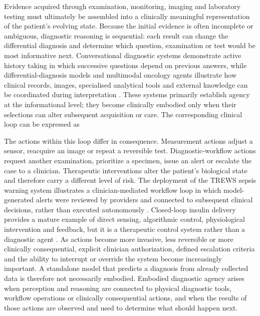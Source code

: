 Evidence acquired through examination, monitoring, imaging and laboratory testing must ultimately be assembled into a clinically meaningful representation of the patient's evolving state. Because the initial evidence is often incomplete or ambiguous, diagnostic reasoning is sequential: each result can change the differential diagnosis and determine which question, examination or test would be most informative next. Conversational diagnostic systems demonstrate active history taking in which successive questions depend on previous answers, while differential-diagnosis models and multimodal oncology agents illustrate how clinical records, images, specialised analytical tools and external knowledge can be coordinated during interpretation \cite{Tu2025ConversationalDiagnosticAI,McDuff2025DifferentialDiagnosis,Ferber2025OncologyAgent}. These systems primarily establish agency at the informational level; they become clinically embodied only when their selections can alter subsequent acquisition or care. The corresponding clinical loop can be expressed as

The actions within this loop differ in consequence. Measurement actions adjust a sensor, reacquire an image or repeat a reversible test. Diagnostic-workflow actions request another examination, prioritize a specimen, issue an alert or escalate the case to a clinician. Therapeutic interventions alter the patient's biological state and therefore carry a different level of risk. The deployment of the TREWS sepsis warning system illustrates a clinician-mediated workflow loop in which model-generated alerts were reviewed by providers and connected to subsequent clinical decisions, rather than executed autonomously \cite{Adams2022TREWS}. Closed-loop insulin delivery provides a mature example of direct sensing, algorithmic control, physiological intervention and feedback, but it is a therapeutic control system rather than a diagnostic agent \cite{Brown2019ClosedLoopDiabetes}. As actions become more invasive, less reversible or more clinically consequential, explicit clinician authorization, defined escalation criteria and the ability to interrupt or override the system become increasingly important. A standalone model that predicts a diagnosis from already collected data is therefore not necessarily embodied. Embodied diagnostic agency arises when perception and reasoning are connected to physical diagnostic tools, workflow operations or clinically consequential actions, and when the results of those actions are observed and used to determine what should happen next.


